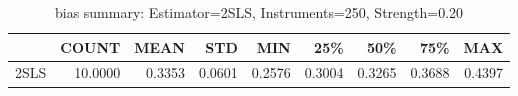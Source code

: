 \begin{table}[ht]
\centering
\caption{bias summary: Estimator=2SLS, Instruments=250, Strength=0.20}
\begin{tabular}{lrrrrrrrr}
\toprule
 & COUNT & MEAN & STD & MIN & 25\% & 50\% & 75\% & MAX \\
\midrule
2SLS & 10.0000 & 0.3353 & 0.0601 & 0.2576 & 0.3004 & 0.3265 & 0.3688 & 0.4397 \\
\bottomrule
\end{tabular}
\end{table}
